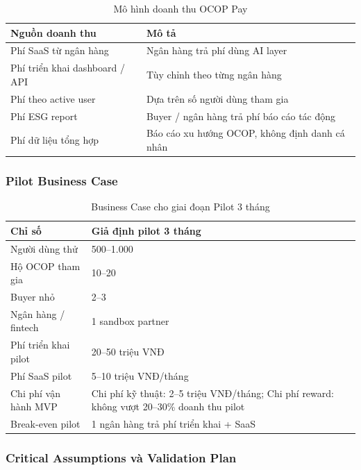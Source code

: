 \documentclass[13pt,a4paper]{extarticle}
\begin{document}
\begin{table}[H]
\centering
\caption{Mô hình doanh thu OCOP Pay}
\begin{tabular}{|p{5cm}|p{9cm}|}
\hline
\textbf{Nguồn doanh thu} & \textbf{Mô tả} \\
\hline
Phí SaaS từ ngân hàng & Ngân hàng trả phí dùng AI layer \\
\hline
Phí triển khai dashboard / API & Tùy chỉnh theo từng ngân hàng \\
\hline
Phí theo active user & Dựa trên số người dùng tham gia \\
\hline
Phí ESG report & Buyer / ngân hàng trả phí báo cáo tác động \\
\hline
Phí dữ liệu tổng hợp & Báo cáo xu hướng OCOP, không định danh cá nhân \\
\hline
\end{tabular}
\end{table}

\subsubsection{Pilot Business Case}

\begin{table}[H]
\centering
\caption{Business Case cho giai đoạn Pilot 3 tháng}
\begin{tabular}{|p{5cm}|p{8cm}|}
\hline
\textbf{Chỉ số} & \textbf{Giả định pilot 3 tháng} \\
\hline
Người dùng thử & 500--1.000 \\
\hline
Hộ OCOP tham gia & 10--20 \\
\hline
Buyer nhỏ & 2--3 \\
\hline
Ngân hàng / fintech & 1 sandbox partner \\
\hline
Phí triển khai pilot & 20--50 triệu VNĐ \\
\hline
Phí SaaS pilot & 5--10 triệu VNĐ/tháng \\
\hline
Chi phí vận hành MVP & Chi phí kỹ thuật: 2--5 triệu VNĐ/tháng; Chi phí reward: không vượt 20--30\% doanh thu pilot \\
\hline
Break-even pilot & 1 ngân hàng trả phí triển khai + SaaS \\
\hline
\end{tabular}
\end{table}

\subsubsection{Critical Assumptions và Validation Plan}
\end{document}
